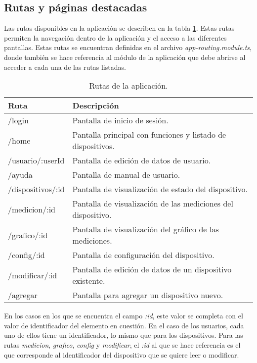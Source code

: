 \subsection{Rutas y páginas destacadas}

Las rutas disponibles en la aplicación se describen en la tabla \ref{tab:rutas}. Estas rutas permiten la navegación dentro de la aplicación y el acceso a las diferentes pantallas. Estas rutas se encuentran definidas en el archivo \textit{app-routing.module.ts}, donde también se hace referencia al módulo de la aplicación que debe abrirse al acceder a cada una de las rutas listadas.

\begin{table}[h]
\centering
\caption[Rutas]{Rutas de la aplicación.}
\begin{tabular}{l l}
\toprule
\textbf{Ruta} 			& \textbf{Descripción}\\
\midrule
/login					& Pantalla de inicio de sesión.\\
/home					& Pantalla principal con funciones y listado de dispositivos.\\
/usuario/:userId			& Pantalla de edición de datos de usuario.\\
/ayuda					& Pantalla de manual de usuario.\\
/dispositivos/:id		& Pantalla de visualización de estado del dispositivo.\\
/medicion/:id			& Pantalla de visualización de las mediciones del dispositivo.\\
/grafico/:id				& Pantalla de visualización del gráfico de las mediciones.\\
/config/:id				& Pantalla de configuración del dispositivo.\\
/modificar/:id			& Pantalla de edición de datos de un dispositivo existente.\\
/agregar					& Pantalla para agregar un dispositivo nuevo.\\
\bottomrule
\hline
\end{tabular}
\label{tab:rutas}
\end{table}

En los casos en los que se encuentra el campo \textit{:id}, este valor se completa con el valor de identificador del elemento en cuestión. En el caso de los usuarios, cada uno de ellos tiene un identificador, lo mismo que para los dispositivos. Para las rutas \textit{medicion}, \textit{grafico}, \textit{config} y \textit{modificar}, el \textit{:id} al que se hace referencia es el que corresponde al identificador del dispositivo que se quiere leer o modificar.

